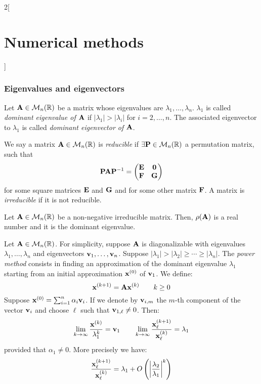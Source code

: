 \documentclass[../../../main.tex]{subfiles}
\begin{document}
\begin{multicols}{2}[\section{Numerical methods}]
\subsubsection*{Eigenvalues and eigenvectors}
\begin{definition}
    Let $\vb{A}\in\mathcal{M}_n(\mathbb{R})$ be a matrix whose eigenvalues are $\lambda_1,\ldots,\lambda_n$. $\lambda_1$ is called \textit{dominant eigenvalue of $\vb{A}$} if $|\lambda_1|>|\lambda_i|$ for $i=2,\ldots,n$. The associated eigenvector to $\lambda_1$ is called \textit{dominant eigenvector of $\vb{A}$}.
\end{definition}
\begin{definition}
    We say a matrix $\vb{A}\in\mathcal{M}_n(\mathbb{R})$ is \textit{reducible} if $\exists\vb{P}\in\mathcal{M}_n(\mathbb{R})$ a permutation matrix, such that $$\vb{P}\vb{A}\vb{P}^{-1}=
    \begin{pmatrix}
        \vb{E} & \vb{0}\\
        \vb{F} & \vb{G}
    \end{pmatrix}$$ for some square matrices $\vb{E}$ and $\vb{G}$ and for some other matrix $\vb{F}$. A matrix is \textit{irreducible} if it is not reducible.
\end{definition}
\begin{theorem}
    Let $\vb{A}\in\mathcal{M}_n(\mathbb{R})$ be a non-negative irreducible matrix. Then, $\rho(\vb{A})$ is a real number and it is the dominant eigenvalue.
\end{theorem}
\begin{method}
    Let $\vb{A}\in\mathcal{M}_n(\mathbb{R})$. For simplicity, suppose $\vb{A}$ is diagonalizable with eigenvalues $\lambda_1,\ldots,\lambda_n$ and eigenvectors $\vb{v}_1,\ldots,\vb{v}_n$. Suppose $|\lambda_1|>|\lambda_2|\geq\cdots\geq|\lambda_n|$. The \textit{power method} consists in finding an approximation of the dominant eigenvalue $\lambda_1$ starting from an initial approximation $\vb{x}^{(0)}$ of $\vb{v}_1$. We define: $$\vb{x}^{(k+1)}=\vb{A}\vb{x}^{(k)}\qquad k\geq 0$$ Suppose $\vb{x}^{(0)}=\sum_{i=1}^n\alpha_i\vb{v}_i$. If we denote by $\vb{v}_{i,m}$ the $m$-th component of the vector $\vb{v}_i$ and choose $\ell$ such that $\vb{v}_{1,\ell}\ne0$. Then: $$\lim_{k\to\infty}\frac{\vb{x}^{(k)}}{\lambda_1^k}=\vb{v}_1\qquad\lim_{k\to\infty}\frac{\vb{x}_\ell^{(k+1)}}{\vb{x}_\ell^{(k)}}=\lambda_1$$ provided that $\alpha_1\ne0$. More precisely we have: $$\frac{\vb{x}_\ell^{(k+1)}}{\vb{x}_\ell^{(k)}}=\lambda_1+O\left(\left|\frac{\lambda_2}{\lambda_1}\right|^k\right)$$

\end{method}
\end{multicols}
\end{document}

